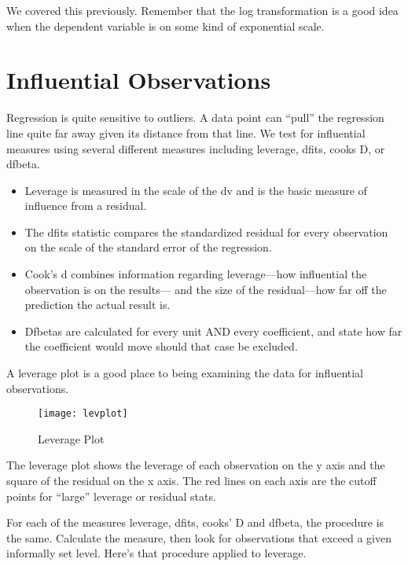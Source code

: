 \documentclass[12pt]{article}
\begin{document}
We covered this previously. Remember that the log transformation is a
good idea when the dependent variable is on some kind of exponential
scale. 

\section{Influential Observations}
\label{sec:infl-observ}

Regression is quite sensitive to outliers. A data point can ``pull''
the regression line quite far away given its distance from that
line. We test for influential measures using several different
measures including 
leverage, dfits, cooks D, or dfbeta.

\begin{itemize}
\item Leverage is measured in the scale of the dv and is the basic
  measure of influence from a residual.

\item The dfits statistic compares the standardized residual for every
  observation on the scale of the standard error of the regression. 

\item Cook's d combines information regarding leverage---how
  influential the observation is on the results--- and the size of the
  residual---how far off the prediction the actual result is. 

\item Dfbetas are calculated for every unit AND every coefficient, and
  state how far the coefficient would move should that case be
  excluded. 

\end{itemize}

A leverage plot is a good place to being examining the data for
influential observations.

\begin{figure}[ht!]
  \centering
  \caption{Leverage Plot}  
\texttt{[image: levplot]}
  \label{fig:levplot}
\end{figure}

The leverage plot shows the leverage of each observation on the y axis
and the square of the residual on the x axis. The red lines on each
axis are the cutoff points for ``large'' leverage or residual stats. 

For each of the measures leverage, dfits, cooks' D and dfbeta, the
procedure is the same. Calculate the measure, then look for
observations that exceed a given informally set level. Here's that procedure
applied to leverage. 
\end{document}
